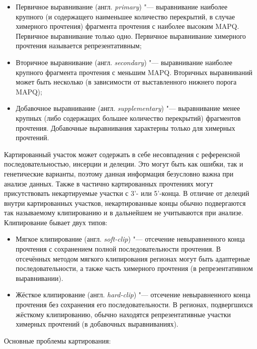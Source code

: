 \documentclass[a4paper,14pt]{extarticle}
\newcommand{\engterm}[1]{англ. \textenglish{\textit{#1}}}
\begin{document}
\begin{itemize}
	\item Первичное выравнивание (\engterm{primary}) "--- выравнивание наиболее крупного (и содержащего наименьшее количество перекрытий, в случае химерного прочтения) фрагмента прочтения с наиболее высоким MAPQ.
	 Первичное выравнивание только одно.
	 Первичное выравнивание химерного прочтения называется репрезентативным;
	\item Вторичное выравнивание (\engterm{secondary}) "--- выравнивание наиболее крупного фрагмента прочтения с меньшим MAPQ.
	 Вторичных выравниваний может быть несколько (в зависимости от выставленного нижнего порога MAPQ);
	\item Добавочное выравнивание (\engterm{supplementary}) "--- выравнивание менее крупных (либо содержащих большее количество перекрытий) фрагментов прочтения.
	 Добавочные выравнивания характерны только для химерных прочтений.
\end{itemize}

Картированный участок может содержать в себе несовпадения с референсной последовательностью, инсерции и делеции.
Это могут быть как ошибки, так и генетические варианты, поэтому данная информация безусловно важна при анализе данных.
Также в частично картированных прочтениях могут присутствовать некартируемые участки с 3'- или 5'-конца.
В отличие от делеций внутри картированных участков, некартированные концы обычно подвергаются так называемому клипированию и в дальнейшем не учитываются при анализе.
Клипирование бывает двух типов:

\begin{itemize}
	\item Мягкое клипирование (\engterm{soft-clip}) "--- отсечение невыравненного конца прочтения с сохранением полной последовательности прочтения.
	 В отсечённых методом мягкого клипирования регионах могут быть адаптерные последовательности, а также часть химерного прочтения (в репрезентативном выравнивании).
	\item Жёсткое клипирование (\engterm{hard-clip}) "--- отсечение невыравненного конца прочтения без сохранения его последовательности.
	 В регионах, подвергшихся жёсткому клипированию, обычно находятся репрезентативные участки химерных прочтений (в добавочных выравниваниях).
\end{itemize}

Основные проблемы картирования:
\end{document}
